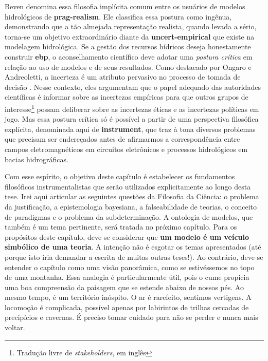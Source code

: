 \documentclass[./main.tex]{subfiles}
\begin{document}
\par Beven denomina essa filosofia implícita comum entre os usuários de modelos hidrológicos de \textbf{\gls{prag-realism}}. Ele classifica essa postura como ingênua, demonstrando que a tão almejada representação realista, quando levada a sério, torna-se um objetivo extraordinário diante da \textbf{\gls{uncert-empirical}} que existe na modelagem hidrológica. Se a gestão dos recursos hídricos deseja honestamente construir \textbf{\gls{ebp}}, o aconselhamento científico deve adotar uma \textit{postura crítica} em relação ao uso de modelos e de seus resultados. Como destacado por Ongaro e Andreoletti, a incerteza é um atributo pervasivo no processo de tomada de decisão \cite{Ongaro2022}. Nesse contexto, eles argumentam que o papel adequado das autoridades científicas é informar sobre as incertezas empíricas para que outros grupos de interesse\footnote{Tradução livre de \textit{stakeholders}, em inglês} possam deliberar sobre as incertezas éticas e as incertezas políticas em jogo. Mas essa postura crítica só é possível a partir de uma perspectiva filosófica explícita, denominada aqui de \textbf{\gls{instrument}}, que traz à tona diversos problemas que precisam ser endereçados antes de afirmarmos a correspondência entre campos eletromagnéticos em circuitos eletrônicos e processos hidrológicos em bacias hidrográficas. 

\par Com esse espírito, o objetivo deste capítulo é estabelecer os fundamentos filosóficos instrumentalistas que serão utilizados explicitamente ao longo desta tese. Irei aqui articular as seguintes questões da Filosofia da Ciência: o problema da justificação, a epistemologia bayesiana, a falseabilidade de teorias, o conceito de paradigmas e o problema da subdeterminação. A ontologia de modelos, que também é um tema pertinente, será tratada no próximo capítulo. Para os propósitos deste capítulo, deve-se considerar que \textbf{um modelo é um veículo simbólico de uma teoria}. A intenção não é esgotar os temas apresentados (até porque isto iria demandar a escrita de muitas outras teses!). Ao contrário, deve-se entender o capítulo como uma visão panorâmica, como se estivéssemos no topo de uma montanha. Essa analogia é particularmente útil, pois o cume propicia uma boa compreensão da paisagem que se estende abaixo de nossos pés. Ao mesmo tempo, é um território inóspito. O ar é rarefeito, sentimos vertigens. A locomoção é complicada, possível apenas por labirintos de trilhas cercadas de precipícios e cavernas. É preciso tomar cuidado para não se perder e nunca mais voltar.
\end{document}
